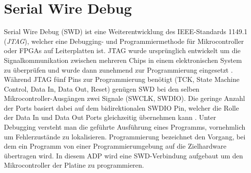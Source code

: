 \section{Serial Wire Debug}
Serial Wire Debug (SWD) ist eine Weiterentwicklung des IEEE-Standards 1149.1 (\textit{JTAG}), welcher eine Debugging- und Programmiermethode für Mikrocontroller oder FPGAs auf Leiterplatten ist. JTAG wurde ursprünglich entwickelt um die Signalkommunikation zwischen mehreren Chips in einem elektronischen System zu überprüfen und wurde dann zunehmend zur Programmierung eingesetzt \cite{swd}. Während JTAG fünf Pins zur Programmierung benötigt (TCK, State Machine Control, Data In, Data Out, Reset) genügen SWD bei den selben Mikrocontroller-Ausgängen zwei Signale (SWCLK, SWDIO). Die geringe Anzahl der Ports basiert dabei auf dem bidirektionalen SWDIO Pin, welcher die Rolle der Data In und Data Out Ports gleichzeitig übernehmen kann \cite{swd}. Unter Debugging versteht man die geführte Ausführung eines Programms, vornehmlich um Fehlerzustände zu lokalisieren. Programmierung bezeichnet den Vorgang, bei dem ein Programm von einer Programmierumgebung auf die Zielhardware übertragen wird. In diesem ADP wird eine SWD-Verbindung aufgebaut um den Mikrocontroller der Platine zu programmieren.